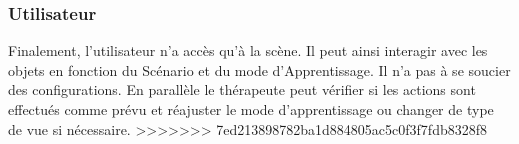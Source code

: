 \subsubsection{Utilisateur}
Finalement, l'utilisateur n'a accès qu'à la scène. Il peut ainsi interagir avec les objets en fonction du Scénario et du mode d'Apprentissage. Il n'a pas à se soucier des configurations. En parallèle le thérapeute peut vérifier si les actions sont effectués comme prévu et réajuster le mode d'apprentissage ou changer de type de vue si nécessaire.
>>>>>>> 7ed213898782ba1d884805ac5c0f3f7fdb8328f8

